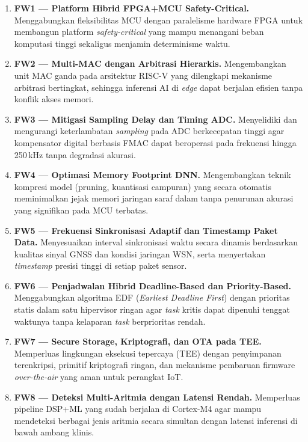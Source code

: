 \documentclass[12pt,a4paper]{article}
\begin{document}
\begin{enumerate}
    \item \textbf{FW1 --- Platform Hibrid FPGA+MCU Safety-Critical.}
    Menggabungkan fleksibilitas MCU dengan paralelisme hardware FPGA untuk membangun platform \textit{safety-critical} yang mampu menangani beban komputasi tinggi sekaligus menjamin determinisme waktu.

    \item \textbf{FW2 --- Multi-MAC dengan Arbitrasi Hierarkis.}
    Mengembangkan unit MAC ganda pada arsitektur RISC-V yang dilengkapi mekanisme arbitrasi bertingkat, sehingga inferensi AI di \textit{edge} dapat berjalan efisien tanpa konflik akses memori.

    \item \textbf{FW3 --- Mitigasi Sampling Delay dan Timing ADC.}
    Menyelidiki dan mengurangi keterlambatan \textit{sampling} pada ADC berkecepatan tinggi agar kompensator digital berbasis FMAC dapat beroperasi pada frekuensi hingga 250\,kHz tanpa degradasi akurasi.

    \item \textbf{FW4 --- Optimasi Memory Footprint DNN.}
    Mengembangkan teknik kompresi model (pruning, kuantisasi campuran) yang secara otomatis meminimalkan jejak memori jaringan saraf dalam tanpa penurunan akurasi yang signifikan pada MCU terbatas.

    \item \textbf{FW5 --- Frekuensi Sinkronisasi Adaptif dan Timestamp Paket Data.}
    Menyesuaikan interval sinkronisasi waktu secara dinamis berdasarkan kualitas sinyal GNSS dan kondisi jaringan WSN, serta menyertakan \textit{timestamp} presisi tinggi di setiap paket sensor.

    \item \textbf{FW6 --- Penjadwalan Hibrid Deadline-Based dan Priority-Based.}
    Menggabungkan algoritma EDF (\textit{Earliest Deadline First}) dengan prioritas statis dalam satu hipervisor ringan agar \textit{task} kritis dapat dipenuhi tenggat waktunya tanpa kelaparan \textit{task} berprioritas rendah.

    \item \textbf{FW7 --- Secure Storage, Kriptografi, dan OTA pada TEE.}
    Memperluas lingkungan eksekusi tepercaya (TEE) dengan penyimpanan terenkripsi, primitif kriptografi ringan, dan mekanisme pembaruan firmware \textit{over-the-air} yang aman untuk perangkat IoT.

    \item \textbf{FW8 --- Deteksi Multi-Aritmia dengan Latensi Rendah.}
    Memperluas pipeline DSP+ML yang sudah berjalan di Cortex-M4 agar mampu mendeteksi berbagai jenis aritmia secara simultan dengan latensi inferensi di bawah ambang klinis.


\end{enumerate}
\end{document}
